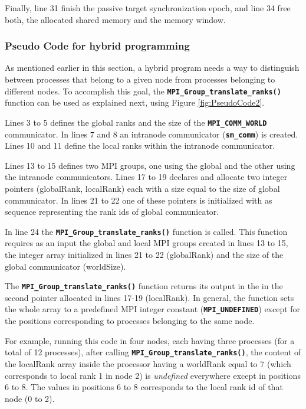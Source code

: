 \medskip

Finally, line 31 finish the passive target synchronization epoch, and line 34 free both, the allocated shared memory and the memory window.


\subsubsection*{Pseudo Code for hybrid programming} \label{PseudoCodeForHybridProgramming}

As mentioned earlier in this section, a hybrid program needs a way to distinguish between processes that belong to a given node from processes belonging to different nodes. To accomplish this goal, the \textbf{\texttt{MPI\_Group\_translate\_ranks()}} function can be used as explained next, using Figure \ref{fig:PseudoCode2}.
 

\medskip

Lines 3 to 5 defines the global ranks and the size of the \textbf{\texttt{MPI\_COMM\_WORLD}} communicator. In lines 7 and 8 an intranode communicator (\textbf{\texttt{sm\_comm}}) is created. Lines 10 and 11 define the local ranks within the intranode communicator.

\medskip

Lines 13 to 15 defines two MPI groups, one using the global and the other using the intranode communicators. Lines 17 to 19 declares and allocate two integer pointers (globalRank, localRank) each with a size equal to the size of global communicator. In lines 21 to 22 one of these pointers is initialized with as sequence representing the rank ids of global communicator.

\medskip

In line 24 the \textbf{\texttt{MPI\_Group\_translate\_ranks()}} function is called. This function requires as an input the global and local MPI groups created in lines 13 to 15, the integer array initialized in lines 21 to 22 (globalRank) and the size of the global communicator (worldSize). 

\medskip

The \textbf{\texttt{MPI\_Group\_translate\_ranks()}} function returns its output in the in the second pointer allocated in lines 17-19 (localRank). In general, the function sets the whole array to a predefined MPI integer constant (\textbf{\texttt{MPI\_UNDEFINED}}) except for the positions corresponding to processes belonging to the same node. 

\medskip

For example, running this code in four nodes, each having three processes (for a total of 12 processes), after calling \textbf{\texttt{MPI\_Group\_translate\_ranks()}}, the content of the localRank array inside the processor having a worldRank equal to 7 (which corresponds to local rank 1 in node 2) is \emph{undefined} everywhere except in positions 6 to 8. The values in positions 6 to 8 corresponds to the local rank id of that node (0 to 2).


